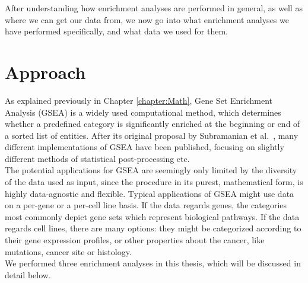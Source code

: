 
After understanding how enrichment analyses are performed in general, as well as where we can get our data from, we now go into what enrichment analyses we have performed specifically, and what data we used for them.

\section{Approach}\label{sec:approach}
As explained previously in Chapter \ref{chapter:Math}, Gene Set Enrichment Analysis (GSEA) is a widely used computational method, which determines whether a predefined category is significantly enriched at the beginning or end of a sorted list of entities.
After its original proposal by Subramanian et al.~\cite{gsea_original}, many different implementations of GSEA have been published, focusing on slightly different methods of statistical post-processing etc.\\
The potential applications for GSEA are seemingly only limited by the diversity of the data used as input, since the procedure in its purest, mathematical form, is highly data-agnostic and flexible. Typical applications of GSEA might use data on a per-gene or a per-cell line basis. If the data regards genes, the categories most commonly depict gene sets which represent biological pathways. If the data regards cell lines, there are many options: they might be categorized according to their gene expression profiles, or other properties about the cancer, like mutations, cancer site or histology.\\
We performed three enrichment analyses in this thesis, which will be discussed in detail below.\\
